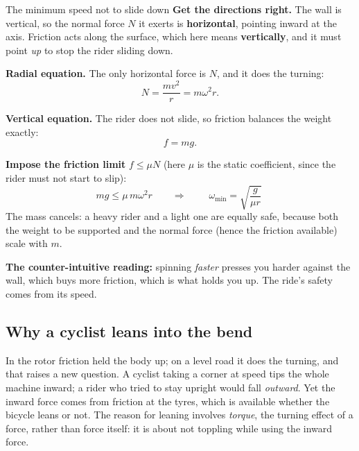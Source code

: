 \begin{derivbox}{The minimum speed not to slide down}
 \textbf{Get the directions right.} The wall is vertical, so the normal force $N$ it
exerts is \textbf{horizontal}, pointing inward at the axis.
Friction acts along the surface, which here means \textbf{vertically}, and it must point \emph{up} to
stop the rider sliding down.

 \textbf{Radial equation.} The only horizontal force is $N$, and it does the turning:
\[
N=\frac{mv^{2}}{r}=m\omega^{2}r.
\]

 \textbf{Vertical equation.} The rider does not slide, so friction balances the weight exactly:
\[
f=mg.
\]

 \textbf{Impose the friction limit} $f\le\mu N$ (here $\mu$ is the static coefficient, since
the rider must not start to slip):
\[
mg\le\mu\,m\omega^{2}r
\qquad\Longrightarrow\qquad
\boxed{\;\omega_{\min}=\sqrt{\frac{g}{\mu r}}\;}
\]
The mass cancels: a heavy rider and a light one are equally safe, because both the weight to be
supported and the normal force (hence the friction available) scale with $m$.

\smallskip
\textbf{The counter-intuitive reading:} spinning \emph{faster} presses you harder against the wall,
which buys more friction, which is what holds you up. The ride's safety comes from its speed.
\end{derivbox}

\subsection{Why a cyclist leans into the bend}
In the rotor friction held the body up; on a level road it does the turning, and that raises a new
question. A cyclist taking a corner at speed tips the whole machine inward; a rider who tried to stay upright
would fall \emph{outward}. Yet the inward force comes from friction at the tyres, which is available
whether the bicycle leans or not. The reason for leaning involves \emph{torque}, the turning effect of a
force, rather than force itself: it is about not toppling while using the inward force.

\begin{figure}[htbp]
\centering
{}
\end{figure}

